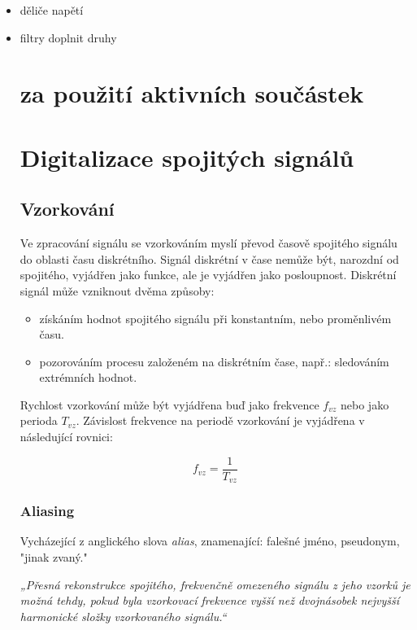\documentclass[oneside,12pt,a4paper]{template/SPSTemplate} %
\begin{document}
			\begin{itemize}
			
				\item děliče napětí
				\item filtry {\color{red} doplnit druhy}

			
		
		\section{za použití aktivních součástek}
	
		\section{Digitalizace spojitých signálů}
		
			\subsection{Vzorkování}
		Ve zpracování signálu se vzorkováním myslí převod časově spojitého signálu do oblasti času diskrétního. 
		Signál diskrétní v čase nemůže být, narozdní od spojitého, vyjádřen jako funkce, ale je vyjádřen jako posloupnost.
		Diskrétní signál může vzniknout dvěma způsoby:
		\begin{itemize}
			\item získáním hodnot spojitého signálu při konstantním, nebo proměnlivém času. \cite{discretization_oppenheim}
			\item pozorováním procesu založeném na diskrétním čase, např.: sledováním extrémních hodnot.
		\end{itemize}
		
		
		Rychlost vzorkování může být vyjádřena buď jako frekvence $ f_{vz} $ nebo jako perioda $ T_{vz} $.
		Závislost frekvence na periodě vzorkování je vyjádřena v následující rovnici:
		
		\begin{equation}
		f_{vz} = \frac{1}{T_{vz}}
		\end{equation}

	
		\subsubsection{Aliasing}
		Vycházející z anglického slova \textit{alias}, znamenající: falešné jméno, pseudonym, "jinak zvaný." 
	

		\textit{„Přesná rekonstrukce spojitého, frekvenčně omezeného signálu z jeho vzorků je možná tehdy, pokud byla vzorkovací frekvence vyšší než dvojnásobek nejvyšší harmonické složky vzorkovaného signálu.“}\cite{sampling_nyquist}
	

\end{itemize}
\end{document}
